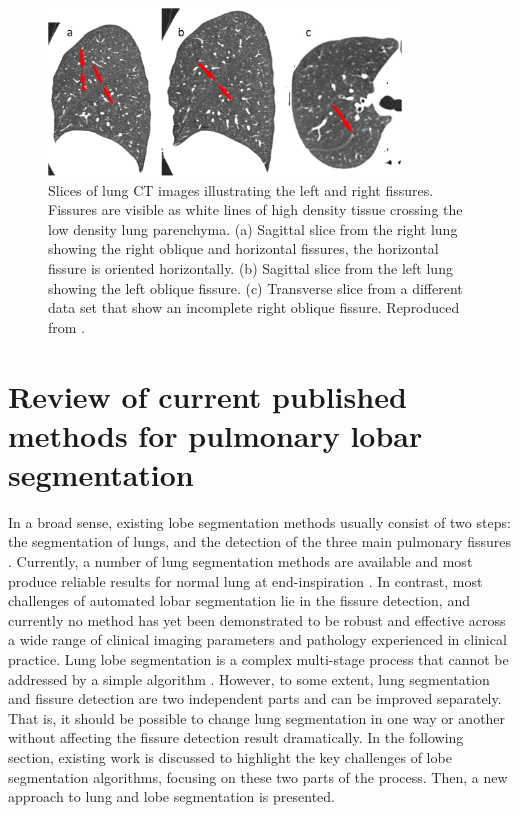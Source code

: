 \begin{figure}[htbp]
  \centering 
  \includegraphics[height=1.75in]{Segmentation/Image/FissureSegmentationChanllenges.jpg}
  \caption{Slices of lung CT images illustrating the left and right fissures. Fissures are visible as white lines of high density tissue crossing the low density lung parenchyma. (a) Sagittal slice from the right lung showing the right oblique and horizontal fissures, the horizontal fissure is oriented horizontally. (b) Sagittal slice from the left lung showing the left oblique fissure. (c) Transverse slice from a different data set that show an incomplete right oblique fissure. Reproduced from \citep{ukil2009anatomy}.}
  \label{fig:FissureSegmentationChanllenges}
\end{figure}

\section{Review of current published methods for pulmonary lobar segmentation} \label{SegmentationReview}
In a broad sense, existing lobe segmentation methods usually consist of two steps: the segmentation of lungs, and the detection of the three main pulmonary fissures \citep{van2013automated}. Currently, a number of lung segmentation methods are available and most produce reliable results for normal lung at end-inspiration \citep{hu2001automatic,ukil2005smoothing,sun20063d,pu2008adaptive,wang2009automated}. In contrast, most challenges of automated lobar segmentation lie in the fissure detection, and currently no method has yet been demonstrated to be robust and effective across a wide range of clinical imaging parameters and pathology experienced in clinical practice. Lung lobe segmentation is a complex multi-stage process that cannot be addressed by a simple algorithm \citep{van2013automated,pu2009computational,ukil2009anatomy}. However, to some extent, lung segmentation and fissure detection are two independent parts and can be improved separately. That is, it should be possible to change lung segmentation in one way or another without affecting the fissure detection result dramatically. In the following section, existing work is discussed to highlight the key challenges of lobe segmentation algorithms, focusing on these two parts of the process. Then, a new approach to lung and lobe segmentation is presented.

